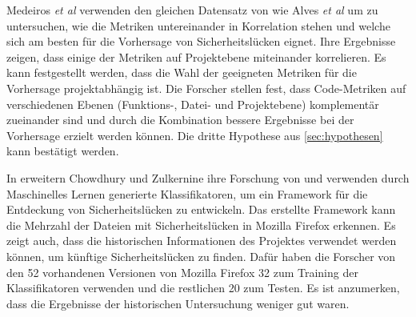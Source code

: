Medeiros \emph{et al} \cite{medeiros_et_al} verwenden den gleichen Datensatz von wie Alves \emph{et al} \cite{alves_et_al} um zu untersuchen, wie die Metriken untereinander in Korrelation stehen und welche sich am besten für die Vorhersage von Sicherheitslücken eignet.
Ihre Ergebnisse zeigen, dass einige der Metriken auf Projektebene miteinander korrelieren.
Es kann festgestellt werden, dass die Wahl der geeigneten Metriken für die Vorhersage projektabhängig ist.
Die Forscher stellen fest, dass Code-Metriken auf verschiedenen Ebenen (Funktions-, Datei- und Projektebene) komplementär zueinander sind und durch die Kombination bessere Ergebnisse bei der Vorhersage erzielt werden können.
Die dritte Hypothese aus \ref{sec:hypothesen} kann bestätigt werden.

In \cite{chowdhury_zulkernine_2009} erweitern Chowdhury und Zulkernine ihre Forschung von \cite{chowdhury_zulkernine_2010} und verwenden durch Maschinelles Lernen generierte Klassifikatoren, um ein Framework für die Entdeckung von Sicherheitslücken zu entwickeln.
Das erstellte Framework kann die Mehrzahl der Dateien mit Sicherheitslücken in Mozilla Firefox erkennen.
Es zeigt auch, dass die historischen Informationen des Projektes verwendet werden können, um künftige Sicherheitslücken zu finden.
Dafür haben die Forscher von den 52 vorhandenen Versionen von Mozilla Firefox 32 zum Training der Klassifikatoren verwenden und die restlichen 20 zum Testen.
Es ist anzumerken, dass die Ergebnisse der historischen Untersuchung weniger gut waren.
